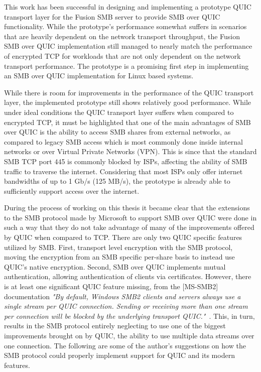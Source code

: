 \documentclass[english, 12pt, a4paper, elec, utf8, a-2b, online]{aaltothesis}
\begin{document}
This work has been successful in designing and implementing a prototype QUIC transport layer
for the Fusion SMB server to provide SMB over QUIC functionality.
While the prototype's performance somewhat suffers in scenarios that are heavily dependent
on the network transport throughput, the Fusion SMB over QUIC implementation still managed to
nearly match the performance of encrypted TCP for workloads that are not only dependent
on the network transport performance. The prototype is a promising first step in implementing an SMB over QUIC
implementation for Linux based systems.

While there is room for improvements in the performance of the QUIC transport layer,
the implemented prototype still shows relatively good performance. While under ideal
conditions the QUIC transport layer suffers when compared to encrypted TCP, it must be highlighted
that one of the main advantages of SMB over QUIC is the ability to access SMB shares from
external networks, as compared to legacy SMB access which is most commonly
done inside internal networks or over Virtual Private Networks (VPN). This is since
that the standard SMB TCP port 445 is commonly blocked by ISPs, affecting the ability
of SMB traffic to traverse the internet. Considering that
most ISPs only offer internet bandwidths of up to 1 Gb/s (125 MB/s), the prototype is
already able to sufficiently support access over the internet.

During the process of working on this thesis it became clear that the extensions
to the SMB protocol made by Microsoft to support SMB over QUIC were done in such a way
that they do not take advantage of many of the improvements offered by QUIC when compared
to TCP. There are only two QUIC specific features utilized by SMB. First, transport level
encryption with the SMB protocol, moving the encryption from an SMB specific per-share basis to
instead use QUIC's native encryption. Second, SMB over QUIC implements mutual
authentication, allowing authentication of clients via certificates. However, there is
at least one significant QUIC feature missing, from
the [MS-SMB2] documentation \textit{"By default, Windows SMB2 clients and servers always use a single stream per QUIC connection.
Sending or receiving more than one stream per connection will be blocked by the underlying transport
QUIC."}~\cite{smb2}. This, in turn, results in the SMB protocol entirely neglecting
to use one of the biggest improvements brought on by QUIC, the ability to use
multiple data streams over one connection. The following are some of the author's suggestions
on how the SMB protocol could properly implement support for QUIC and its
modern features.
\end{document}
